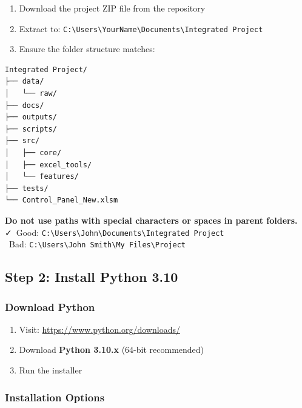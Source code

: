 \documentclass[11pt,a4paper]{article}
\begin{document}
\begin{enumerate}[leftmargin=*]
    \item Download the project ZIP file from the repository
    \item Extract to: \texttt{C:\textbackslash Users\textbackslash YourName\textbackslash Documents\textbackslash Integrated Project}
    \item Ensure the folder structure matches:
\end{enumerate}

\begin{lstlisting}[style=shellstyle, frame=single]
Integrated Project/
├── data/
│   └── raw/
├── docs/
├── outputs/
├── scripts/
├── src/
│   ├── core/
│   ├── excel_tools/
│   └── features/
├── tests/
└── Control_Panel_New.xlsm
\end{lstlisting}

\begin{warningbox}[title=Important: Folder Location]
\textbf{Do not use paths with special characters or spaces in parent folders.}\\[0.3cm]
\faCheck\ Good: \texttt{C:\textbackslash Users\textbackslash John\textbackslash Documents\textbackslash Integrated Project}\\
\faTimes\ Bad: \texttt{C:\textbackslash Users\textbackslash John Smith\textbackslash My Files\textbackslash Project}
\end{warningbox}

\subsection{Step 2: Install Python 3.10}

\subsubsection{Download Python}

\begin{enumerate}[leftmargin=*]
    \item Visit: \url{https://www.python.org/downloads/}
    \item Download \textbf{Python 3.10.x} (64-bit recommended)
    \item Run the installer
\end{enumerate}

\subsubsection{Installation Options}
\end{document}

